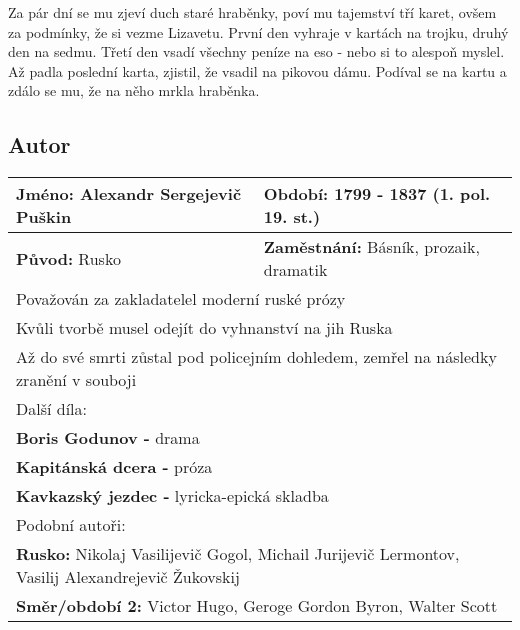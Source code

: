 Za pár dní se mu zjeví duch staré hraběnky, poví mu tajemství tří karet, ovšem za podmínky, že si vezme Lizavetu.
První den vyhraje v kartách na trojku, druhý den na sedmu.
Třetí den vsadí všechny peníze na eso - nebo si to alespoň myslel.
Až padla poslední karta, zjistil, že vsadil na pikovou dámu.
Podíval se na kartu a zdálo se mu, že na něho mrkla hraběnka.
\subsection*{Autor}
\begin{tabularx}{\linewidth}{l|l}
  \textbf{Jméno:} Alexandr Sergejevič Puškin & \textbf{Období:} 1799 - 1837 (1. pol. 19. st.)                                  \\
  \hline
  \textbf{Původ:} Rusko                      & \textbf{Zaměstnání:} Básník, prozaik, dramatik                                  \\
  \hline
  \multicolumn{2}{l}{Považován za zakladatelel moderní ruské prózy}                                                            \\
  \multicolumn{2}{l}{Kvůli tvorbě musel odejít do vyhnanství na jih Ruska}                                                     \\
  \multicolumn{2}{l}{Až do své smrti zůstal pod policejním dohledem, zemřel na následky zranění v souboji}                     \\
  \hline
  \multicolumn{2}{l}{Další díla:}                                                                                              \\
  \multicolumn{2}{l}{\textbf{Boris Godunov -} drama}                                                                           \\
  \multicolumn{2}{l}{\textbf{Kapitánská dcera -} próza}                                                                        \\
  \multicolumn{2}{l}{\textbf{Kavkazský jezdec -} lyricka-epická skladba}                                                       \\
  \hline
  \multicolumn{2}{l}{Podobní autoři:}                                                                                          \\
  \multicolumn{2}{l}{\textbf{Rusko:} Nikolaj Vasilijevič Gogol, Michail Jurijevič Lermontov, Vasilij Alexandrejevič Žukovskij} \\
  \multicolumn{2}{l}{\textbf{Směr/období 2:} Victor Hugo, Geroge Gordon Byron, Walter Scott}                                   \\
\end{tabularx}
